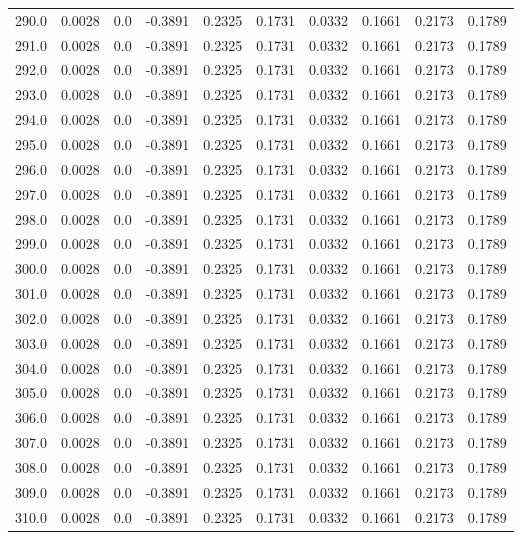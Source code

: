 \begin{longtable}{lrrrrrrrrr}
290.0 & 0.0028 & 0.0 & -0.3891 & 0.2325 & 0.1731 & 0.0332 & 0.1661 & 0.2173 & 0.1789 \\
291.0 & 0.0028 & 0.0 & -0.3891 & 0.2325 & 0.1731 & 0.0332 & 0.1661 & 0.2173 & 0.1789 \\
292.0 & 0.0028 & 0.0 & -0.3891 & 0.2325 & 0.1731 & 0.0332 & 0.1661 & 0.2173 & 0.1789 \\
293.0 & 0.0028 & 0.0 & -0.3891 & 0.2325 & 0.1731 & 0.0332 & 0.1661 & 0.2173 & 0.1789 \\
294.0 & 0.0028 & 0.0 & -0.3891 & 0.2325 & 0.1731 & 0.0332 & 0.1661 & 0.2173 & 0.1789 \\
295.0 & 0.0028 & 0.0 & -0.3891 & 0.2325 & 0.1731 & 0.0332 & 0.1661 & 0.2173 & 0.1789 \\
296.0 & 0.0028 & 0.0 & -0.3891 & 0.2325 & 0.1731 & 0.0332 & 0.1661 & 0.2173 & 0.1789 \\
297.0 & 0.0028 & 0.0 & -0.3891 & 0.2325 & 0.1731 & 0.0332 & 0.1661 & 0.2173 & 0.1789 \\
298.0 & 0.0028 & 0.0 & -0.3891 & 0.2325 & 0.1731 & 0.0332 & 0.1661 & 0.2173 & 0.1789 \\
299.0 & 0.0028 & 0.0 & -0.3891 & 0.2325 & 0.1731 & 0.0332 & 0.1661 & 0.2173 & 0.1789 \\
300.0 & 0.0028 & 0.0 & -0.3891 & 0.2325 & 0.1731 & 0.0332 & 0.1661 & 0.2173 & 0.1789 \\
301.0 & 0.0028 & 0.0 & -0.3891 & 0.2325 & 0.1731 & 0.0332 & 0.1661 & 0.2173 & 0.1789 \\
302.0 & 0.0028 & 0.0 & -0.3891 & 0.2325 & 0.1731 & 0.0332 & 0.1661 & 0.2173 & 0.1789 \\
303.0 & 0.0028 & 0.0 & -0.3891 & 0.2325 & 0.1731 & 0.0332 & 0.1661 & 0.2173 & 0.1789 \\
304.0 & 0.0028 & 0.0 & -0.3891 & 0.2325 & 0.1731 & 0.0332 & 0.1661 & 0.2173 & 0.1789 \\
305.0 & 0.0028 & 0.0 & -0.3891 & 0.2325 & 0.1731 & 0.0332 & 0.1661 & 0.2173 & 0.1789 \\
306.0 & 0.0028 & 0.0 & -0.3891 & 0.2325 & 0.1731 & 0.0332 & 0.1661 & 0.2173 & 0.1789 \\
307.0 & 0.0028 & 0.0 & -0.3891 & 0.2325 & 0.1731 & 0.0332 & 0.1661 & 0.2173 & 0.1789 \\
308.0 & 0.0028 & 0.0 & -0.3891 & 0.2325 & 0.1731 & 0.0332 & 0.1661 & 0.2173 & 0.1789 \\
309.0 & 0.0028 & 0.0 & -0.3891 & 0.2325 & 0.1731 & 0.0332 & 0.1661 & 0.2173 & 0.1789 \\
310.0 & 0.0028 & 0.0 & -0.3891 & 0.2325 & 0.1731 & 0.0332 & 0.1661 & 0.2173 & 0.1789 \\

\end{longtable}
